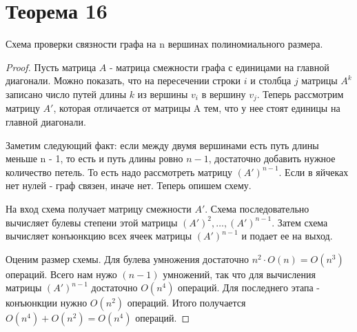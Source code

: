 \documentclass[a4paper,12pt]{article}
\begin{document}
	\section{Теорема 16}
    \begin{theorem}
        Схема проверки связности графа на n вершинах полиномиального размера.
    \end{theorem}
    \begin{proof}
        Пусть матрица $A$ - матрица смежности графа с единицами на главной диагонали.
        Можно показать, что на пересечении строки $i$ и столбца $j$ матрицы $A^{k}$
        записано число путей длины $k$ из вершины $v_i$ в вершину $v_j$.
        Теперь рассмотрим матрицу $A'$, которая отличается от матрицы A тем, что
        у нее стоят единицы на главной диагонали.
        
        Заметим следующий факт: если между двумя вершинами есть путь длины меньше n - 1,
        то есть и путь длины
        ровно $n-1$, достаточно добавить нужное количество петель. То есть надо рассмотреть
        матрицу $(A')^{n-1}$. Если в яйчеках нет нулей - граф связен, иначе нет. Теперь
        опишем схему.
        
        На вход схема получает матрицу смежности $A'$. Схема последовательно
        вычисляет булевы степени этой матрицы $(A')^2,\ldots,(A')^{n-1}$. Затем
        схема вычисляет конъюнкцию всех ячеек матрицы $(A')^{n-1}$ и подает ее на выход.
        
        Оценим размер схемы. Для булева умножения достаточно $n^2\cdot O(n) = O(n^3)$
        операций. Всего нам нужо $(n-1)$ умножений, так что для вычисления матрицы $(A')^{n-1}$
        достаточно $O(n^4)$ операций. Для последнего этапа - конъюнкции нужно $O(n^2)$
        операций. Итого получается $O(n^4)+O(n^2) = O(n^4)$ операций.
        
    \end{proof}
    
\end{document}
